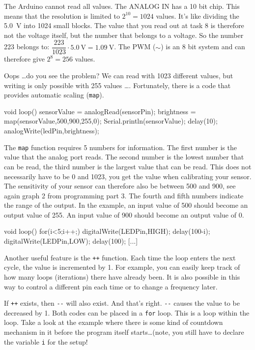 \documentclass{arduino}
\begin{document}
The Arduino cannot read all values. The ANALOG IN has a 10 bit chip. This means that the resolution is limited to $ 2^{10} = 1024 $ values. It's like dividing the \SI{5.0}{\volt} into 1024 small blocks. The value that you read out at task 8 is therefore not the voltage itself, but the number that belongs to a voltage. So the number 223 belongs to: $ \dfrac{223}{1023} \cdot \SI{5.0}{\volt} = \SI{1.09}{\volt} $. The PWM ($\sim$) is an 8 bit system and can therefore give $ 2^8 = 256 $ values.

Oops \dots do you see the problem? We can read with 1023 different values, but writing is only possible with 255 values ​​\dots. Fortunately, there is a code that provides automatic scaling (\lstinline{map}).

\begin{marginlisting}
void loop() {
  sensorValue = analogRead(sensorPin);
  brightness = map(sensorValue,500,900,255,0);
  Serial.println(sensorValue);
  delay(10);
  analogWrite(ledPin,brightness);
}
\end{marginlisting}
The \lstinline{map} function requires 5 numbers for information. The first number is the value that the analog port reads. The second number is the lowest number that can be read, the third number is the largest value that can be read. This does not necessarily have to be 0 and 1023, you get the value when calibrating your sensor. The sensitivity of your sensor can therefore also be between 500 and 900, see again graph 2 from programming part 3. The fourth and fifth numbers indicate the range of the output. In the example, an input value of 500 should become an output value of 255. An input value of 900 should become an output value of 0.

\begin{marginlisting}
void loop(){
  for(i<5;i++;) {
    digitalWrite(LEDPin,HIGH);
    delay(100-i);
    digitalWrite(LEDPin,LOW);
    delay(100);
  }
  [...]
}
\end{marginlisting}
Another useful feature is the \lstinline{++} function. Each time the loop enters the next cycle, the value is incremented by 1. For example, you can easily keep track of how many loops (iterations) there have already been. It is also possible in this way to control a different pin each time or to change a frequency later.

If \lstinline{++} exists, then \lstinline{--} will also exist. And that's right. \lstinline{--} causes the value to be decreased by 1. Both codes can be placed in a \lstinline{for} loop. This is a loop within the loop. Take a look at the example where there is some kind of countdown mechanism in it before the program itself starts\dots (note, you still have to declare the variable \lstinline{i} for the setup!
\end{document}
